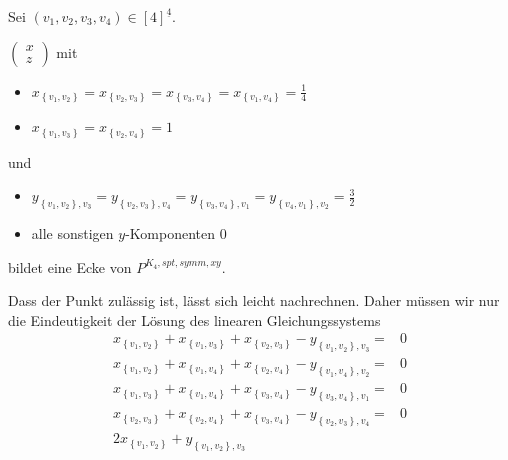 \documentclass[10p,a4paper,BCOR = 12mm, DIV=15]{scrbook}
\begin{document}
{\begin{Sa}
\label{sa:nichtganzz_ecke_P^xy}
Sei $\left(v_1, v_2, v_3, v_4\right) \in \left[4\right]^{\underline{4}}$.

$
\left(\begin{array}{c}
x \\
z
\end{array}\right)
$ mit
\begin{itemize}
\item $x_{\left\{v_1, v_2\right\}} = x_{\left\{v_2, v_3\right\}} = x_{\left\{v_3, v_4\right\}} = x_{\left\{v_1, v_4\right\}} = \frac{1}{4}$
\item $x_{\left\{v_1, v_3\right\}} = x_{\left\{v_2, v_4\right\}} = 1$
\end{itemize}
und
\begin{itemize}
\item  $y_{\left\{v_1, v_2\right\}, v_3} = y_{\left\{v_2, v_3\right\}, v_4} = y_{\left\{v_3, v_4\right\}, v_1} = y_{\left\{v_4, v_1\right\}, v_2} = \frac{3}{2}$
\item alle sonstigen $y$-Komponenten $0$
\end{itemize}
bildet eine Ecke von $P^{K_4, spt, symm, xy}$.
\end{Sa}
\begin{bew}
Dass der Punkt zulässig ist, lässt sich leicht nachrechnen. Daher müssen wir nur die Eindeutigkeit der Lösung des linearen Gleichungssystems
{
\allowdisplaybreaks
\begin{align*}
x_{\left\{v_1, v_2\right\}} + x_{\left\{v_1, v_3\right\}} + x_{\left\{v_2, v_3\right\}} - y_{\left\{v_1, v_2\right\}, v_3}
 = & 0 \\
x_{\left\{v_1, v_2\right\}} + x_{\left\{v_1, v_4\right\}} + x_{\left\{v_2, v_4\right\}}
 - y_{\left\{v_1, v_4\right\}, v_2}
 = & 0 \\
x_{\left\{v_1, v_3\right\}} + x_{\left\{v_1, v_4\right\}} + x_{\left\{v_3, v_4\right\}}
 - y_{\left\{v_3, v_4\right\}, v_1} = & 0 \\
x_{\left\{v_2, v_3\right\}} + x_{\left\{v_2, v_4\right\}} + x_{\left\{v_3, v_4\right\}} - y_{\left\{v_2, v_3\right\}, v_4}
 = & 0 \\
2 x_{\left\{v_1, v_2\right\}} + y_{\left\{v_1, v_2\right\}, v_3} 

\end{align*}}
\end{bew}}
\end{document}
